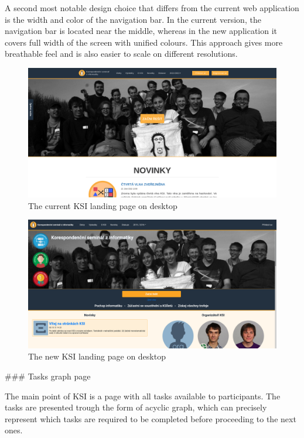 \documentclass[
  digital, %
  oneside, %
  lof,     %
  nolot,     %
]{fithesis4}
\begin{document}
{A second most notable design choice that differs from the current web application is the width and color of the navigation bar. In the current version, the navigation bar is located near the middle, whereas in the new application it covers full width of the screen with unified colours. This approach gives more breathable feel and is also easier to scale on different resolutions.

\begin{figure}
\includegraphics[width=\textwidth]{assets/img/welcome_curr}
\caption{The current KSI landing page on desktop}
\label{fig:welcome-curr}
\end{figure}

\begin{figure}
\includegraphics[width=\textwidth]{assets/img/welcome_new}
\caption{The new KSI landing page on desktop}
\label{fig:welcome-new}
\end{figure}

### Tasks graph page

The main point of KSI is a page with all tasks available to participants. The tasks are presented trough the form of acyclic graph, which can precisely represent which tasks are required to be completed before proceeding to the next ones.

}
\end{document}
